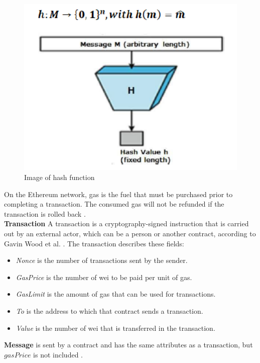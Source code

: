 \begin{center}
	\begin{figure}[htb!]
		
		\begin{minipage}{0.2\linewidth}
			\centering
			\includegraphics[width=4.5\textwidth]{images/chap01_hash_function.png}
		\end{minipage}
		\caption[Image of hash function]{Image of hash function \cite{Dworkin}}
		
	\end{figure}
	
\end{center}

On the Ethereum network, gas is the fuel that must be purchased prior to completing a transaction. The consumed gas will not be refunded if the transaction is rolled back \cite{Egbertsen}.\\
\textbf{Transaction}
 A transaction is a cryptography-signed instruction that is carried out by an external actor, which can be a person or another contract, according to Gavin Wood et al. \cite{Gavin}. The transaction describes these fields:
     \begin{itemize}
         \item \textit{Nonce} is the number of transactions sent by the sender.
         \item \textit{GasPrice} is the number of wei to be paid per unit of gas.
         \item \textit{GasLimit} is the amount of gas that can be used for transactions.
         \item \textit{To} is the address to which that contract sends a transaction.
         \item \textit{Value} is the number of wei that is transferred in the transaction.
    \end{itemize}
\textbf{Message} is sent by a contract and has the same attributes as a transaction, but $gasPrice$ is not included \cite{Egbertsen}.\\
